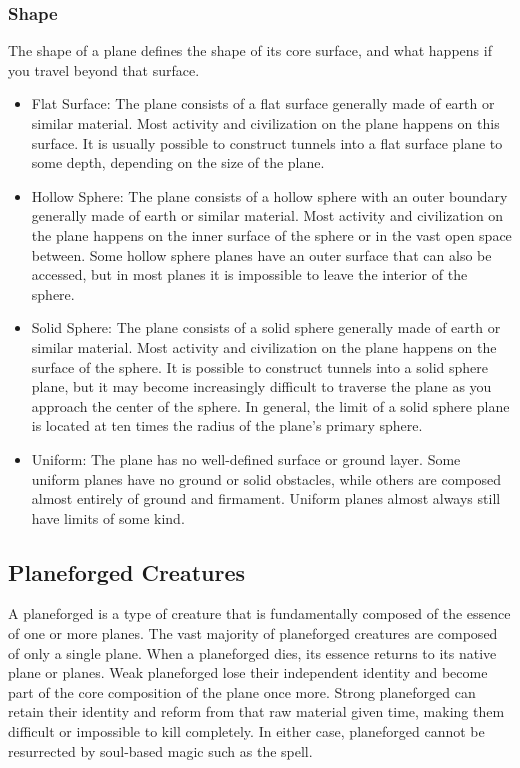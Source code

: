     \subsubsection{Shape} The shape of a plane defines the shape of its core surface, and what happens if you travel beyond that surface.

      \begin{itemize}
        \item Flat Surface: The plane consists of a flat surface generally made of earth or similar material.
          Most activity and civilization on the plane happens on this surface.
          It is usually possible to construct tunnels into a flat surface plane to some depth, depending on the size of the plane.
        \item Hollow Sphere: The plane consists of a hollow sphere with an outer boundary generally made of earth or similar material.
          Most activity and civilization on the plane happens on the inner surface of the sphere or in the vast open space between.
          Some hollow sphere planes have an outer surface that can also be accessed, but in most planes it is impossible to leave the interior of the sphere.
        \item Solid Sphere: The plane consists of a solid sphere generally made of earth or similar material.
          Most activity and civilization on the plane happens on the surface of the sphere.
          It is possible to construct tunnels into a solid sphere plane, but it may become increasingly difficult to traverse the plane as you approach the center of the sphere.
          In general, the limit of a solid sphere plane is located at ten times the radius of the plane's primary sphere.
        \item Uniform: The plane has no well-defined surface or ground layer.
          Some uniform planes have no ground or solid obstacles, while others are composed almost entirely of ground and firmament.
          Uniform planes almost always still have limits of some kind.
      \end{itemize}

  \subsection{Planeforged Creatures}
    A planeforged is a type of creature that is fundamentally composed of the essence of one or more planes.
    The vast majority of planeforged creatures are composed of only a single plane.
    When a planeforged dies, its essence returns to its native plane or planes.
    Weak planeforged lose their independent identity and become part of the core composition of the plane once more.
    Strong planeforged can retain their identity and reform from that raw material given time, making them difficult or impossible to kill completely.
    In either case, planeforged cannot be resurrected by soul-based magic such as the  spell.

